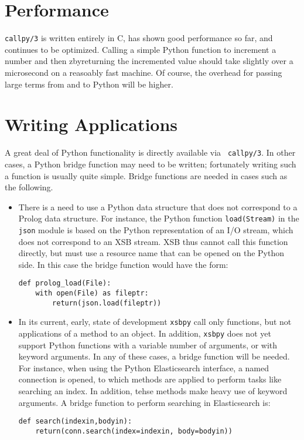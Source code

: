 \section{Performance}

{\tt callpy/3} is written entirely in C, has shown good performance so
far, and continues to be optimized.  Calling a simple Python function
to increment a number and then zbyreturning the incremented value should
take slightly over a microsecond on a reasoably fast machine.  Of
course, the overhead for passing large terms from and to Python will
be higher.

\section{Writing Applications}

A great deal of Python functionality is directly available via {\tt
  callpy/3}.  In other cases, a Python bridge function may need to be
written; fortunately writing such a function is usually quite
simple.  Bridge functions are needed in cases such as the following.

\begin{itemize}
  \item There is a need to use a Python data structure that does not
    correspond to a Prolog data structure.  For instance, the Python
    function {\tt load(Stream)} in the {\tt json} module is based on
    the Python representation of an I/O stream, which does not
    correspond to an XSB stream.  XSB thus cannot call this function
    directly, but must use a resource name that can be opened on the
    Python side.  In this case the bridge function would have the
    form:

\begin{verbatim}   
def prolog_load(File):
    with open(File) as fileptr:
        return(json.load(fileptr))
\end{verbatim}

\item In its current, early, state of development {\tt xsbpy} call
  only functions, but not applications of a method to an object.  In
  addition, {\tt xsbpy} does not yet support Python functions with a
  variable number of arguments, or with keyword arguments.  In any of
  these cases, a bridge function will be needed.  For instance, when
  using the Python Elasticsearch interface, a named connection is
  opened, to which methods are applied to perform tasks like searching
  an index.  In addition, tehse methods make heavy use of keyword
  arguments.  A bridge function to perform searching in Elasticsearch
  is:

\begin{verbatim}
def search(indexin,bodyin):
    return(conn.search(index=indexin, body=bodyin))
\end{verbatim}
\end{itemize}

